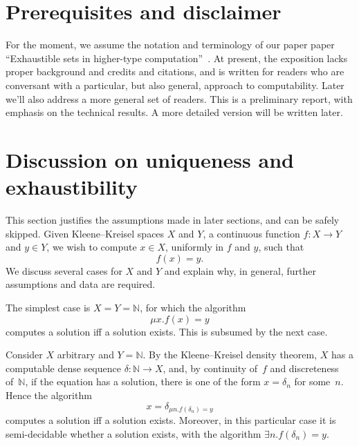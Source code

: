 \documentclass[10pt]{article}
\newcommand{\N}{\mathbb{N}}
\begin{document}
\section{Prerequisites and disclaimer} \label{prerequisites}

For the moment, we assume the notation and terminology of our paper
paper ``Exhaustible sets in higher-type
computation''~\cite{escardo:exhaustible}.  At present, the exposition
lacks proper background and credits and citations, and is written for
readers who are conversant with a particular, but also general,
approach to computability. Later we'll also address a more general set
of readers. This is a preliminary report, with emphasis on the
technical results.  A more detailed version will be written later. 

\section{Discussion on uniqueness and exhaustibility} 
\label{discussion}

This section justifies the assumptions made in later sections, and can
be safely skipped.
%
Given Kleene--Kreisel spaces $X$ and $Y$,
a continuous function $f \colon X \to Y$ and $y \in Y$,
we wish to compute $x \in X$, uniformly in $f$ and $y$, such that
\[
f(x)=y.
\]
We discuss several cases for $X$ and $Y$ and explain why, in general,
further assumptions and data are required.

The simplest case is $X=Y=\N$, for which the algorithm
\[
\mu x. f(x)=y
\]
computes a solution iff a solution exists. This is subsumed by the
next case. 

Consider $X$ arbitrary and $Y=\N$. By the Kleene--Kreisel density
theorem, $X$ has a computable dense sequence $\delta \colon \N \to X$, and,
by continuity of~$f$ and discreteness of~$\N$, if the equation has a
solution, there is one of the form $x=\delta_n$ for some~$n$. Hence the
algorithm
\[
x = \delta_{\mu n. f(\delta_n)=y}
\]
computes a solution iff a solution exists. Moreover, in this
particular case it is semi-decidable whether a solution exists,
with the algorithm $\exists n. f(\delta_n)=y$.
\end{document}
